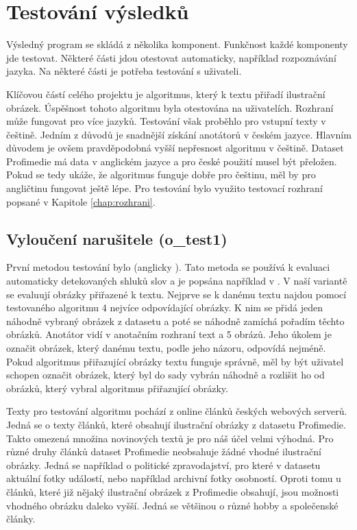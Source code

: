 \chapter{Testování výsledků}

Výsledný program se skládá z několika komponent. Funkčnost každé komponenty jde testovat. Některé části jdou otestovat automaticky, například rozpoznávání jazyka. Na některé části je potřeba testování s uživateli.

Klíčovou částí celého projektu je algoritmus, který k textu přiřadí ilustrační obrázek. Úspěšnost tohoto algoritmu byla otestována na uživatelích. Rozhraní může fungovat pro více jazyků. Testování však proběhlo pro vstupní texty v češtině. Jedním z důvodů je snadnější získání anotátorů v českém jazyce. Hlavním důvodem je ovšem pravděpodobná vyšší nepřesnost algoritmu v češtině. Dataset Profimedie má data v anglickém jazyce a pro české použití musel být přeložen. Pokud se tedy ukáže, že algoritmus funguje dobře pro češtinu, měl by pro angličtinu fungovat ještě lépe. Pro testování bylo využito testovací rozhraní popsané v Kapitole \ref{chap:rozhrani}.


\section{Vyloučení narušitele (o\_test1)}

První metodou testování bylo  (anglicky ). Tato metoda se používá k evaluaci automaticky detekovaných shluků slov a je popsána například v \cite{chang}. V naší variantě se evaluují obrázky přiřazené k textu. Nejprve se k danému textu najdou pomocí testovaného algoritmu 4 nejvíce odpovídající obrázky. K nim se přidá jeden náhodně vybraný obrázek z datasetu a poté se náhodně zamíchá pořadím těchto obrázků. Anotátor vidí v anotačním rozhraní text a 5 obrázů. Jeho úkolem je označit obrázek, který danému textu, podle jeho názoru, odpovídá nejméně. Pokud algoritmus přiřazující obrázky textu funguje správně, měl by být uživatel schopen označit obrázek, který byl do sady vybrán náhodně a rozlišit ho od obrázků, který vybral algoritmus přiřazující obrázky.

Texty pro testování algoritmu pochází z online článků českých webových serverů. Jedná se o texty článků, které obsahují ilustrační obrázky z datasetu Profimedie. Takto omezená množina novinových textů je pro náš účel velmi výhodná. Pro různé druhy článků dataset Profimedie neobsahuje žádné vhodné ilustrační obrázky. Jedná se například o politické zpravodajství, pro které v datasetu aktuální fotky událostí, nebo například archivní fotky osobností. Oproti tomu u článků, které již nějaký ilustrační obrázek z Profimedie obsahují, jsou možnosti vhodného obrázku daleko vyšší. Jedná se většinou o různé hobby a společenské články.

